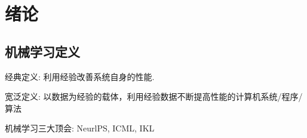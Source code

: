 \newpage
\section{绪论}

\subsection{机械学习定义}

经典定义: 利用经验改善系统自身的性能. 

宽泛定义: 以数据为经验的载体，利用经验数据不断提高性能的计算机系统/程序/算法

机械学习三大顶会: NeurlPS, ICML, IKL



